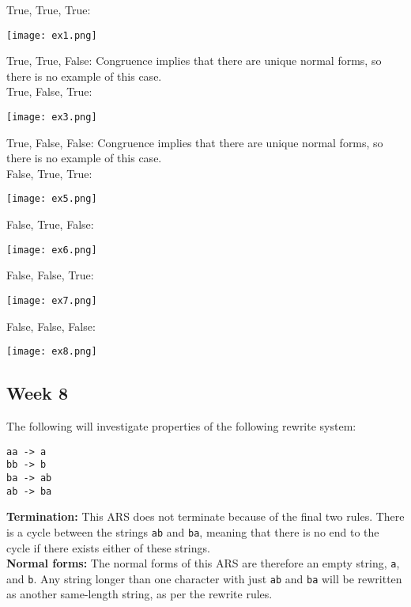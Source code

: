 \documentclass{article}
\theoremstyle{theorem}
\theoremstyle{definition}
\theoremstyle{remark}
\begin{document}
True, True, True:
\begin{center}
    \texttt{[image: ex1.png]}
\end{center}

True, True, False: Congruence implies that there are unique normal forms, so there is no example of this case.\\

True, False, True:
\begin{center}
    \texttt{[image: ex3.png]}
\end{center}

True, False, False: Congruence implies that there are unique normal forms, so there is no example of this case.\\

False, True, True:
\begin{center}
    \texttt{[image: ex5.png]}
\end{center}

False, True, False:
\begin{center}
    \texttt{[image: ex6.png]}
\end{center}

False, False, True:
\begin{center}
    \texttt{[image: ex7.png]}
\end{center}

False, False, False:
\begin{center}
    \texttt{[image: ex8.png]}
\end{center}
\newpage
\subsection{Week 8}
The following will investigate properties of the following rewrite system:
\begin{lstlisting}
aa -> a
bb -> b
ba -> ab
ab -> ba
\end{lstlisting}

\noindent \textbf{Termination: } This ARS does not terminate because of the final two rules. There is a cycle between the strings \texttt{ab} and \texttt{ba}, meaning that there is no end to the cycle if there exists either of these strings.\\

\noindent \textbf{Normal forms: } The normal forms of this ARS are therefore an empty string, \texttt{a}, and \texttt{b}. Any string longer than one character with just \texttt{ab} and \texttt{ba} will be rewritten as another same-length string, as per the rewrite rules.\\
\end{document}
